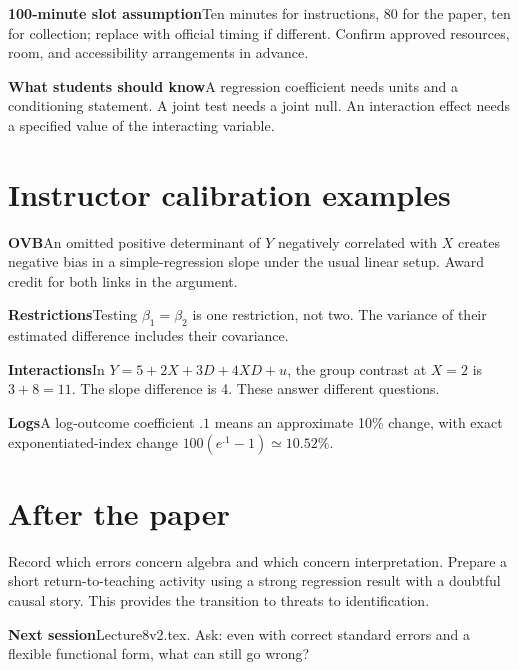 \documentclass[11pt,a4paper]{article}
\newcommand{\heading}[1]{\section*{\color{accent}#1}}
\newcommand{\cue}[2]{\par\noindent\textbf{#1}\quad #2\par}
\begin{document}
\cue{100-minute slot assumption}{Ten minutes for instructions, 80 for the paper, ten for collection; replace with official timing if different. Confirm approved resources, room, and accessibility arrangements in advance.}
\cue{What students should know}{A regression coefficient needs units and a conditioning statement. A joint test needs a joint null. An interaction effect needs a specified value of the interacting variable.}
\heading{Instructor calibration examples}
\cue{OVB}{An omitted positive determinant of $Y$ negatively correlated with $X$ creates negative bias in a simple-regression slope under the usual linear setup. Award credit for both links in the argument.}
\cue{Restrictions}{Testing $\beta_1=\beta_2$ is one restriction, not two. The variance of their estimated difference includes their covariance.}
\cue{Interactions}{In $Y=5+2X+3D+4XD+u$, the group contrast at $X=2$ is $3+8=11$. The slope difference is 4. These answer different questions.}
\cue{Logs}{A log-outcome coefficient $.1$ means an approximate 10\% change, with exact exponentiated-index change $100(e^{.1}-1)\simeq10.52\%$.}
\heading{After the paper}
Record which errors concern algebra and which concern interpretation. Prepare a short return-to-teaching activity using a strong regression result with a doubtful causal story. This provides the transition to threats to identification.
\cue{Next session}{Lecture8v2.tex. Ask: even with correct standard errors and a flexible functional form, what can still go wrong?}
\end{document}
